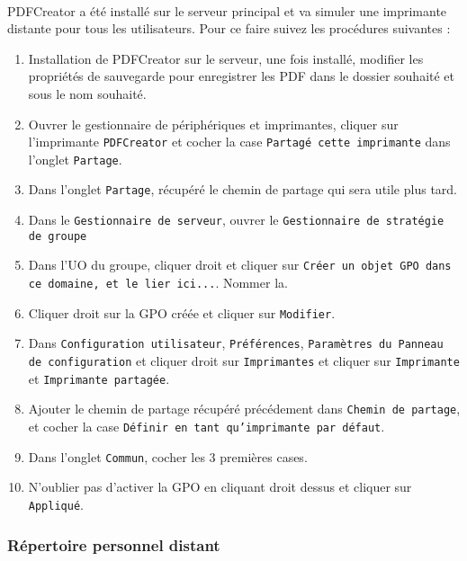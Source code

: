 			\paragraph{}
				PDFCreator a été installé sur le serveur principal et va simuler une imprimante distante pour tous les utilisateurs. Pour ce faire suivez les procédures suivantes : 
				\begin{enumerate}
					\item Installation de PDFCreator sur le serveur, une fois installé, modifier les propriétés de sauvegarde pour enregistrer les PDF dans le dossier souhaité et sous le nom souhaité.
					\item Ouvrer le gestionnaire de périphériques et imprimantes, cliquer sur l'imprimante \texttt{PDFCreator} et cocher la case \texttt{Partagé cette imprimante} dans l'onglet \texttt{Partage}.
					\item Dans l'onglet \texttt{Partage}, récupéré le chemin de partage qui sera utile plus tard.
					\item Dans le \texttt{Gestionnaire de serveur}, ouvrer le \texttt{Gestionnaire de stratégie de groupe}
					\item Dans l'UO du groupe, cliquer droit et cliquer sur \texttt{Créer un objet GPO dans ce domaine, et le lier ici...}. Nommer la. 
					\item Cliquer droit sur la GPO créée et cliquer sur \texttt{Modifier}.
					\item Dans \texttt{Configuration utilisateur}, \texttt{Préférences}, \texttt{Paramètres du Panneau de configuration} et cliquer droit sur \texttt{Imprimantes} et cliquer sur \texttt{Imprimante} et \texttt{Imprimante partagée}.
					\item Ajouter le chemin de partage récupéré précédement dans \texttt{Chemin de partage}, et cocher la case \texttt{Définir en tant qu'imprimante par défaut}.
					\item Dans l'onglet \texttt{Commun}, cocher les 3 premières cases.
					\item N'oublier pas d'activer la GPO en cliquant droit dessus et cliquer sur \texttt{Appliqué}.
				\end{enumerate}

		\subsubsection{Répertoire personnel distant}
